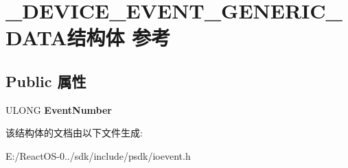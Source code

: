 \hypertarget{struct___d_e_v_i_c_e___e_v_e_n_t___g_e_n_e_r_i_c___d_a_t_a}{}\section{\+\_\+\+D\+E\+V\+I\+C\+E\+\_\+\+E\+V\+E\+N\+T\+\_\+\+G\+E\+N\+E\+R\+I\+C\+\_\+\+D\+A\+T\+A结构体 参考}
\label{struct___d_e_v_i_c_e___e_v_e_n_t___g_e_n_e_r_i_c___d_a_t_a}
\subsection*{Public 属性}
\begin{DoxyCompactItemize}
\item 
\mbox{\label{struct___d_e_v_i_c_e___e_v_e_n_t___g_e_n_e_r_i_c___d_a_t_a_a4addcf6b13d6ecab9c8ff0f0f9f046ad}} 
U\+L\+O\+NG {\bfseries Event\+Number}
\end{DoxyCompactItemize}


该结构体的文档由以下文件生成\+:\begin{DoxyCompactItemize}
\item 
E\+:/\+React\+O\+S-\/0../sdk/include/psdk/ioevent.\+h\end{DoxyCompactItemize}
